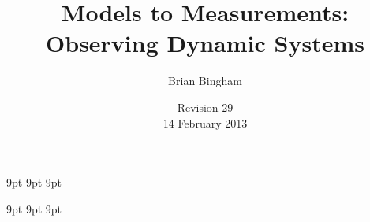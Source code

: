 \documentclass[11pt]{book}
\begin{document}
\newif\ifsolutions

\graphicspath{{./}{./figs/}}

%

\newcommand{\bmcode}{\begin{lstlisting}[style=myMatStyle]}
\newcommand{\emcode}{\end{lstlisting}}

\newcommand{\SF}{0.2}
\newcommand{\SFb}{0.3}

\newcommand{\FigWidth}{0.7}
\newcommand{\ThisFigWidth}{0.7}

\newcommand{\scaleOneTwo}[2] {\scalebox{#2}}

\graphicspath{{./figs/}}


     {9pt}%
     {9pt}%
     {\itshape}%
     {}%
     {\bfseries}%
     {}%
     {9pt}%
     {}%


\theoremstyle{myex}
\newtheorem{ex}{Exercise}[chapter]

     {9pt}%
     {9pt}%
     {\itshape}%
     {}%
     {\bfseries}%
     {}%
     {9pt}%
     {}%

\theoremstyle{mysoln}
\newtheorem*{soln}{Solution}

\frontmatter
\ifsolutions
\newcommand{\thetitle}{Models to Measurements: \\Observing Dynamic Systems \\ WITH SOLUTIONS}
\else
\newcommand{\thetitle}{Models to Measurements: \\Observing Dynamic Systems}
\fi
\title{\thetitle}
\author{Brian Bingham}
\date{Revision 29\\14 February 2013}
\end{document}
